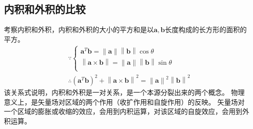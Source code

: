 \subsection{内积和外积的比较}

考察内积和外积，内积和外积的大小的平方和是以$\boldsymbol{a},\boldsymbol{b}$长度构成的长方形的面积的平方。
\begin{align*}
&\because \begin{cases}
	\boldsymbol{a}^T\boldsymbol{b}=\left\| \boldsymbol{a} \right\| \left\| \boldsymbol{b} \right\| \cos \theta\\
	\left\| \boldsymbol{a}\times \boldsymbol{b} \right\| =\left\| \boldsymbol{a} \right\| \left\| \boldsymbol{b} \right\| \sin \theta\\
\end{cases} \\
&\therefore \left( \boldsymbol{a}^T\boldsymbol{b} \right) ^2+\left\| \boldsymbol{a}\times \boldsymbol{b} \right\| ^2=\left\| \boldsymbol{a} \right\| ^2\left\| \boldsymbol{b} \right\| ^2
\end{align*}
该关系式说明，内积和外积是一对关系，是一个本源分裂出来的两个概念。
物理意义上，是矢量场对区域的两个作用（收扩作用和自旋作用）的反映。
矢量场对一个区域的膨胀或收缩的效应，会用到内积运算，对该区域的自旋效应，会用到外积运算。




